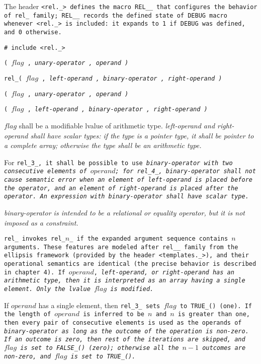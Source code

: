 The header \tt{<rel._>} defines the macro \tt{REL__} that configures
the behavior of \tt{rel_} family; \tt{REL__} records the \tt{defined}
state of \tt{DEBUG} macro whenever \tt{<rel._>} is included:
it expands to \tt{1} if \tt{DEBUG} was defined, and \tt{0} otherwise.


\tt{# include <rel._>}

\s\s\s\tt{(} $flag$ \tt{,}
\it{unary-operator}  \tt{,} \it{operand} \tt{)}

 \tt{rel_}\s\s\s\tt{(} $flag$ \tt{,} \it{left-operand} \tt{,}
\it{binary-operator} \tt{,} \it{right-operand} \tt{)}

\s\tt{(} $flag$ \tt{,}
\it{unary-operator}  \tt{,} \it{operand} \tt{)}

\s\tt{(} $flag$ \tt{,} \it{left-operand} \tt{,}
\it{binary-operator} \tt{,} \it{right-operand} \tt{)}


$flag$ shall be a modifiable lvalue of arithmetic type.
\it{left-operand} and \it{right-operand} shall have scalar types:
if the type is a pointer type, it shall be pointer to a
complete array; otherwise the type shall be an arithmetic type.

For \tt{rel_3_}, it shall be possible to use \it{binary-operator} with two
consecutive elements of $operand$; for \tt{rel_4_}, \it{binary-operator} shall
not cause semantic error when an element of \it{left-operand} is placed before
the operator, and an element of \it{right-operand} is placed after the operator.
An expression with \it{binary-operator} shall have scalar type.

\note \it{binary-operator} is intended to be a relational or
equality operator, but it is not imposed as a constraint.


\tt{rel_} invokes \tt{rel_}$n$\_ if the
expanded argument sequence contains $n$ arguments.
These features are modeled after  \tt{rel__} family from the ellipsis
framework (provided by the header \tt{<templates._>}), and their operational
semantics are identical (the precise behavior is described in chapter 4).
If $operand$, \it{left-operand}, or \it{right-operand} has an arithmetic type,
then it is interpreted as an array having a single element.
Only the lvalue $flag$ is modified.

If $operand$ has a single element, then
\tt{rel_3_} sets $flag$ to \tt{TRUE_()} (one).
If the length of $operand$ is inferred to be $n$ and $n$ is greater than
one, then every pair of consecutive elements is used as the operands of
\it{binary-operator} as long as the outcome of the operation is non-zero.
If an outcome is zero, then rest of the iterations are skipped,
and $flag$ is set to \tt{FALSE_()} (zero); otherwise all the
$n - 1$ outcomes are non-zero, and $flag$ is set to \tt{TRUE_()}.

